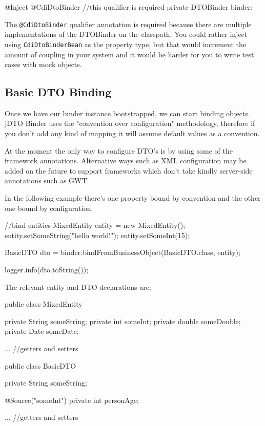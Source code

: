 \documentclass[11pt]{article}
\newcommand{\JDTO}{jDTO Binder\xspace}
\begin{document}
\begin{java}
@Inject
@CdiDtoBinder //this qualifier is required
private DTOBinder binder;
\end{java}

The \texttt{@CdiDtoBinder} qualifier annotation is required because there are multiple implementations of the DTOBinder on the classpath. You could rather inject using \texttt{CdiDtoBinderBean} as the property type, but that would increment the amount of coupling in your system and it would be harder for you to write test cases with mock objects.

\subsection{Basic DTO Binding}


Once we have our binder instance bootstrapped, we can start binding objects. \JDTO uses the "convention over configuration"
methodology, therefore if you don't add any kind of mapping it will assume default values as a convention. 

At the moment the only way to configure DTO's is by using some of the framework annotations. Alternative ways such as XML configuration may be added on the future to support frameworks which don't take kindly server-side annotations such as GWT.

In the following example there's one property bound by convention and the other one bound by configuration.


\begin{java}
//bind entities
MixedEntity entity = new MixedEntity();
entity.setSomeString("hello world!");
entity.setSomeInt(15);
        
BasicDTO dto = binder.bindFromBusinessObject(BasicDTO.class, entity);
        
logger.info(dto.toString());
\end{java}

The relevant entity and DTO declarations are:


\begin{java}
 public class MixedEntity {
    private String someString;
    private int someInt;
    private double someDouble;
    private Date someDate;
    
    ... //getters and setters
}

public class BasicDTO {
    private String someString;
    
    @Source("someInt")
    private int personAge;
    
    ... //getters and setters
}
\end{java}
\end{document}

